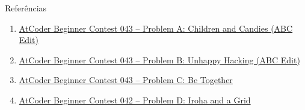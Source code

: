 \begin{frame}[fragile]{Referências}

    \begin{enumerate}
        \item \href{https://atcoder.jp/contests/abc043/tasks/abc043_a}{AtCoder Beginner Contest 
            043 -- Problem A: Children and Candies (ABC Edit)}

        \item \href{https://atcoder.jp/contests/abc043/tasks/abc043_b}{AtCoder Beginner Contest 
            043 -- Problem B: Unhappy Hacking (ABC Edit)}

        \item \href{https://atcoder.jp/contests/abc042/tasks/arc059_a}{AtCoder Beginner Contest
            043 -- Problem C: Be Together}

        \item \href{https://atcoder.jp/contests/abc042/tasks/arc058_b}{AtCoder Beginner Contest
            042 -- Problem D: Iroha and a Grid}
    \end{enumerate}

\end{frame}
